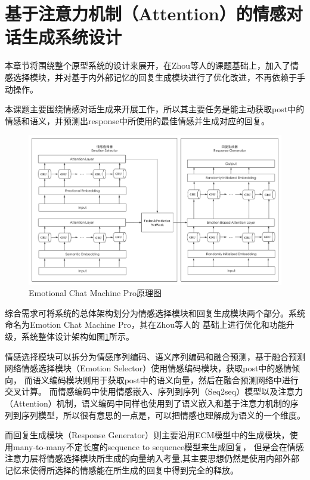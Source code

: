 \documentclass[supercite]{HustGraduPaper}
\theoremstyle{definition}
\begin{document}
\section{基于注意力机制（Attention）的情感对话生成系统设计}
本章节将围绕整个原型系统的设计来展开，在Zhou\cite{DBLP:journals/corr/ZhouHZZL17}等人的课题基础上，加入了情感选择模块，并对基于内外部记忆的回复生成模块进行了优化改进，不再依赖于手动操作。

本课题主要围绕情感对话生成来开展工作，所以其主要任务是能主动获取post中的情感和语义，并预测出response中所使用的最佳情感并生成对应的回复。
\begin{figure}[H] %
  \centering %
  \includegraphics[width=1\textwidth]{images/ECMP.png} %
  \caption{Emotional Chat Machine Pro原理图} %
  \label{Fig.ECMP} %
\end{figure}
综合需求可将系统的总体架构划分为情感选择模块和回复生成模块两个部分。系统命名为Emotion Chat Machine Pro，其在Zhou等人\cite{DBLP:journals/corr/ZhouHZZL17}的
基础上进行优化和功能升级，系统整体设计架构如图\ref{Fig.ECMP}所示。

情感选择模块可以拆分为情感序列编码、语义序列编码和融合预测，基于融合预测网络情感选择模块\cite{wei2019emotion}（Emotion Selector）使用情感编码模块，获取post中的感情倾向，
而语义编码模块则用于获取post中的语义向量，然后在融合预测网络中进行交叉计算。
而情感编码中使用情感嵌入、序列到序列（Seq2seq）模型以及注意力（Attention）机制，语义编码中同样也使用到了语义嵌入和基于注意力机制的序列到序列模型，所以很有意思的一点是，可以把情感也理解成为语义的一个维度。

而回复生成模块（Response Generator）则主要沿用ECM\cite{DBLP:journals/corr/ZhouHZZL17}模型中的生成模块，使用many-to-many不定长度的sequence to sequence模型来生成回复，
但是会在情感注意力层将情感选择模块所生成的向量纳入考量,其主要思想仍然是使用内部外部记忆来使得所选择的情感能在所生成的回复中得到完全的释放。
\end{document}
